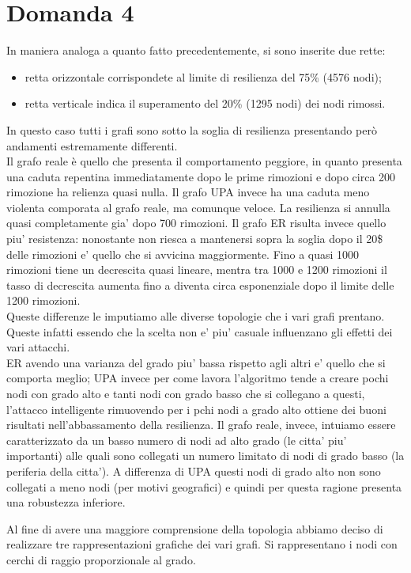 \documentclass{article}
\begin{document}
\section*{Domanda 4}
In maniera analoga a quanto fatto precedentemente, si sono inserite due rette:
\begin{itemize}
	\item retta orizzontale corrispondete al limite di resilienza del 75\% (4576 nodi);
	\item retta verticale indica il superamento del 20\% (1295 nodi) dei nodi rimossi. 
\end{itemize}
In questo caso tutti i grafi sono sotto la soglia di resilienza presentando però andamenti estremamente differenti.\\
Il grafo reale è quello che presenta il comportamento peggiore, in quanto presenta una caduta repentina immediatamente dopo le prime rimozioni e dopo circa 200 rimozione ha relienza quasi nulla.
Il grafo UPA invece ha una caduta meno violenta comporata al grafo reale, ma comunque veloce. La resilienza si annulla quasi completamente gia' dopo 700 rimozioni.
Il grafo ER risulta invece quello piu' resistenza: nonostante non riesca a mantenersi sopra la soglia dopo il 20\$ delle rimozioni e' quello che si avvicina maggiormente. Fino a quasi 1000 rimozioni tiene un decrescita quasi lineare, mentra tra 1000 e 1200 rimozioni il tasso di decrescita aumenta fino a diventa circa esponenziale dopo il limite delle 1200 rimozioni.\\
Queste differenze le imputiamo alle diverse topologie che i vari grafi prentano. Queste infatti essendo che la scelta non e' piu' casuale influenzano gli effetti dei vari attacchi.\\
ER avendo una varianza del grado piu' bassa rispetto agli altri e' quello che si comporta meglio; UPA invece per come lavora l'algoritmo tende a creare pochi nodi con grado alto e tanti nodi con grado basso che si collegano a questi, l'attacco intelligente rimuovendo per i pchi nodi a grado alto ottiene dei buoni risultati nell'abbassamento della resilienza.
Il grafo reale, invece, intuiamo essere caratterizzato da un basso numero di nodi ad alto grado (le citta' piu' importanti) alle quali sono collegati un numero limitato di nodi di grado basso (la periferia della citta'). A differenza di UPA questi nodi di grado alto non sono collegati a meno nodi (per motivi geografici) e quindi per questa ragione presenta una robustezza inferiore.

Al fine di avere una maggiore comprensione della topologia abbiamo deciso di realizzare tre rappresentazioni grafiche dei vari grafi. Si rappresentano i nodi con cerchi di raggio proporzionale al grado.
\end{document}
